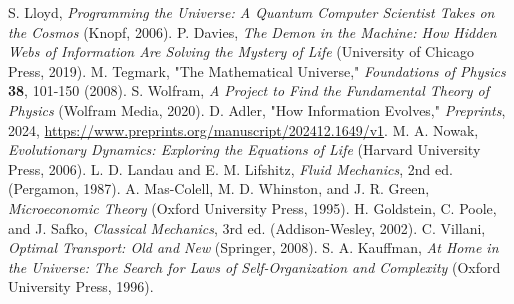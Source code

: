 \documentclass[%
 preprint, linenumbers,
 amsmath,amssymb,
 aps, physrev,
]{revtex4-2}
\begin{document}
\begin{thebibliography}{9}
     S. Lloyd, \textit{Programming the Universe: A Quantum Computer Scientist Takes on the Cosmos} (Knopf, 2006).
     P. Davies, \textit{The Demon in the Machine: How Hidden Webs of Information Are Solving the Mystery of Life} (University of Chicago Press, 2019).
     M. Tegmark, "The Mathematical Universe," \textit{Foundations of Physics} \textbf{38}, 101-150 (2008).
     S. Wolfram, \textit{A Project to Find the Fundamental Theory of Physics} (Wolfram Media, 2020).
     D. Adler, "How Information Evolves," \textit{Preprints}, 2024, \url{https://www.preprints.org/manuscript/202412.1649/v1}.
     M. A. Nowak, \textit{Evolutionary Dynamics: Exploring the Equations of Life} (Harvard University Press, 2006).
     L. D. Landau and E. M. Lifshitz, \textit{Fluid Mechanics}, 2nd ed. (Pergamon, 1987).
     A. Mas-Colell, M. D. Whinston, and J. R. Green, \textit{Microeconomic Theory} (Oxford University Press, 1995).
     H. Goldstein, C. Poole, and J. Safko, \textit{Classical Mechanics}, 3rd ed. (Addison-Wesley, 2002).
     C. Villani, \textit{Optimal Transport: Old and New} (Springer, 2008).
     S. A. Kauffman, \textit{At Home in the Universe: The Search for Laws of Self-Organization and Complexity} (Oxford University Press, 1996).
\end{thebibliography}
\end{document}
